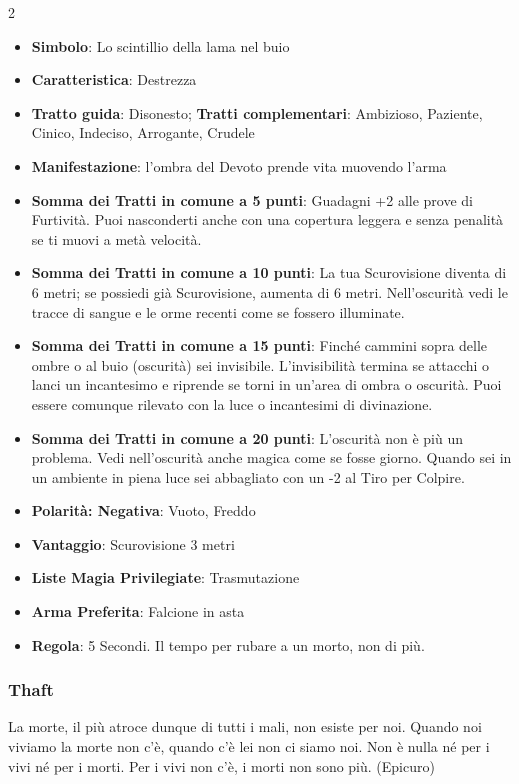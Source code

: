 \begin{multicols}{2}
\begin{itemize}[leftmargin=*] \setlength{\itemsep}{0pt}
\item \textbf{Simbolo}: Lo scintillio della lama nel buio
\item \textbf{Caratteristica}: Destrezza
\item \textbf{Tratto guida}: Disonesto; \textbf{Tratti complementari}: Ambizioso, Paziente, Cinico, Indeciso, Arrogante, Crudele
\item \textbf{Manifestazione}: l'ombra del Devoto prende vita muovendo l'arma
\item \textbf{Somma dei Tratti in comune a 5 punti}: Guadagni +2 alle prove di Furtività. Puoi nasconderti anche con una copertura leggera e senza penalità se ti muovi a metà velocità.
\item \textbf{Somma dei Tratti in comune a 10 punti}: La tua Scurovisione diventa di 6 metri; se possiedi già Scurovisione, aumenta di 6 metri. Nell'oscurità vedi le tracce di sangue e le orme recenti come se fossero illuminate.
\item \textbf{Somma dei Tratti in comune a 15 punti}: Finché cammini sopra delle ombre o al buio (oscurità) sei invisibile. L'invisibilità termina se attacchi o lanci un incantesimo e riprende se torni in un'area di ombra o oscurità. Puoi essere comunque rilevato con la luce o incantesimi di divinazione.
\item \textbf{Somma dei Tratti in comune a 20 punti}: L'oscurità non è più un problema. Vedi nell'oscurità anche magica come se fosse giorno. Quando sei in un ambiente in piena luce sei abbagliato con un -2 al Tiro per Colpire.
\item \textbf{Polarità: Negativa}: Vuoto, Freddo
\item \textbf{Vantaggio}: Scurovisione 3 metri
\item \textbf{Liste Magia Privilegiate}: Trasmutazione
\item \textbf{Arma Preferita}: Falcione in asta
\item \textbf{Regola}: 5 Secondi. Il tempo per rubare a un morto, non di più.
\end{itemize}

\subsubsection{Thaft}\label{thaft}\hypertarget{thaft}{}

\begin{enfasi}{
La morte, il più atroce dunque di tutti i mali, non esiste per noi. Quando noi viviamo la morte non c'è, quando c'è lei non ci siamo noi. Non è nulla né per i vivi né per i morti. Per i vivi non c'è, i morti non sono più. (Epicuro)
}\end{enfasi}


\end{multicols}

